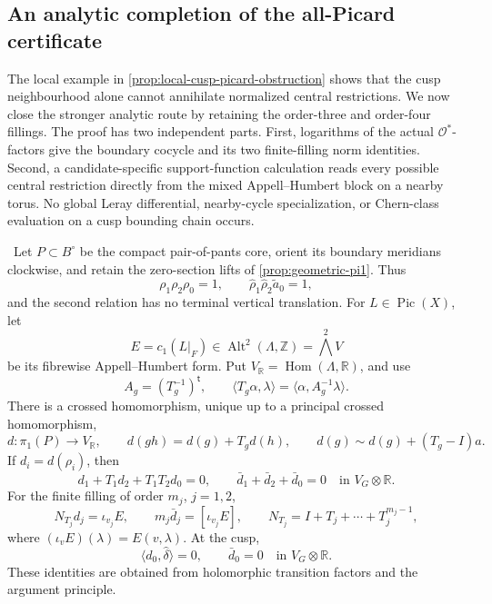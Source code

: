 \subsection{An analytic completion of the all-Picard certificate}
\label{subsec:analytic-all-picard}

The local example in \cref{prop:local-cusp-picard-obstruction} shows that
the cusp neighbourhood alone cannot annihilate normalized central
restrictions.  We now close the stronger analytic route by retaining the
order-three and order-four fillings.  The proof has two independent parts.
First, logarithms of the actual \(\mathcal O^*\)-factors give the boundary
cocycle and its two finite-filling norm identities.  Second, a
candidate-specific support-function calculation reads every possible
central restriction directly from the mixed Appell--Humbert block on a
nearby torus.  No global Leray differential, nearby-cycle specialization,
or Chern-class evaluation on a cusp bounding chain occurs.

\begin{proposition}
\label{prop:analytic-ah-boundary}
\Verified\ Let \(P\subset B^\circ\) be the compact pair-of-pants core,
orient its boundary meridians clockwise, and retain the zero-section lifts
of \cref{prop:geometric-pi1}.  Thus
\[
 \rho_1\rho_2\rho_0=1,
 \qquad
 \widehat\rho_1\widehat\rho_2\widetilde a_0=1,
\tag{5.17-A1}
\]
and the second relation has no terminal vertical translation.  For
\(L\in\operatorname{Pic}(X)\), let
\[
 E=c_1(L|_F)\in\operatorname{Alt}^2(\Lambda,\mathbb Z)
   =\bigwedge^2V
\]
be its fibrewise Appell--Humbert form.  Put
\(V_{\mathbb R}=\operatorname{Hom}(\Lambda,\mathbb R)\), and use
\[
 A_g=(T_g^{-1})^{\mathsf t},
 \qquad
 \langle T_g\alpha,\lambda\rangle
 =\langle\alpha,A_g^{-1}\lambda\rangle.
\tag{5.17-A2}
\]
There is a crossed homomorphism, unique up to a principal crossed
homomorphism,
\[
 d:\pi_1(P)\longrightarrow V_{\mathbb R},
 \qquad
 d(gh)=d(g)+T_gd(h),
 \qquad
 d(g)\sim d(g)+(T_g-I)a.
\tag{5.17-A3}
\]
If \(d_i=d(\rho_i)\), then
\[
 d_1+T_1d_2+T_1T_2d_0=0,
 \qquad
 \bar d_1+\bar d_2+\bar d_0=0
 \quad\text{in }V_G\otimes\mathbb R.
\tag{5.17-A4}
\]
For the finite filling of order \(m_j\), \(j=1,2\),
\[
 N_{T_j}d_j=\iota_{v_j}E,
 \qquad
 m_j\bar d_j=[\iota_{v_j}E],
 \qquad
 N_{T_j}=I+T_j+\cdots+T_j^{m_j-1},
\tag{5.17-A5}
\]
where \((\iota_vE)(\lambda)=E(v,\lambda)\).  At the cusp,
\[
 \langle d_0,\widehat\delta\rangle=0,
 \qquad
 \bar d_0=0\quad\text{in }V_G\otimes\mathbb R.
\tag{5.17-A6}
\]
These identities are obtained from holomorphic transition factors and the
argument principle.
\end{proposition}

